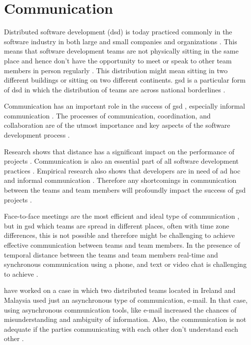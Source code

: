 \chapter{Communication}
Distributed software development (\ac{dsd}) is today practiced commonly in the software industry in both large and small companies and organizations \citep{shrivastava2010distributed}. This means that software development teams are not physically sitting in the same place and hence don’t have the opportunity to meet or speak to other team members in person regularly \citep{layman2006essential}. This distribution might mean sitting in two different buildings or sitting on two different continents. \ac{gsd} is a particular form of \ac{dsd} in which the distribution of teams are across national borderlines \citep{sahay2003global}. 

Communication has an important role in the success of \ac{gsd} \citep{carmel2001tactical,french1998study}, especially informal communication \citep{herbsleb2003empirical}. The processes of communication, coordination, and collaboration are of the utmost importance and key aspects of the software development process \citep{colomo2014agile}. 

Research shows that distance has a significant impact on the performance of projects \citep{damian2003global,Herbsleb2001a}. Communication is also an essential part of all software development practices \citep{layman2006essential}. Empirical research also shows that developers are in need of ad hoc and informal communication \citep{grinter1998recomposition,kraut1995coordination}. Therefore any shortcomings in communication between the teams and team members will profoundly impact the success of \ac{gsd} projects \citep{layman2006essential}.

Face-to-face meetings are the most efficient and ideal type of communication \citep{Kirkman2004}, but in \ac{gsd} which teams are spread in different places, often with time zone differences, this is not possible and therefore might be challenging to achieve effective communication between teams and team members. In the presence of temporal distance between the teams and team members real-time and synchronous communication using a phone, and text or video chat is challenging to achieve \citep{holmstrom2006agile,kommeren2007philips}.

\citet{casey2008impact} have worked on a case in which two distributed teams located in Ireland and Malaysia used just an asynchronous type of communication, e-mail. In that case, using asynchronous communication tools, like e-mail increased the chances of misunderstanding and ambiguity of information. Also, the communication is not adequate if the parties communicating with each other don’t understand each other \citep{kommeren2007philips,cataldo2007coordination}.

